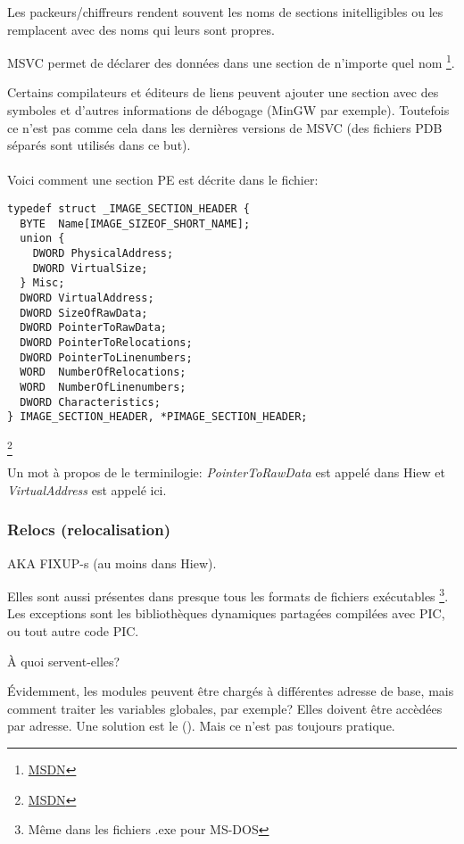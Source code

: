 Les packeurs/chiffreurs rendent souvent les noms de sections initelligibles ou les
remplacent avec des noms qui leurs sont propres.

\ac{MSVC} permet de déclarer des données dans une section de n'importe quel nom
\footnote{\href{http://go.yurichev.com/17047}{MSDN}}.

Certains compilateurs et éditeurs de liens peuvent ajouter une section avec des symboles
et d'autres informations de débogage (MinGW par exemple).
Toutefois ce n'est pas comme cela dans les dernières versions de \ac{MSVC} (des fichiers
\gls{PDB} séparés sont utilisés dans ce but).\\
\\
Voici comment une section PE est décrite dans le fichier:

\begin{lstlisting}
typedef struct _IMAGE_SECTION_HEADER {
  BYTE  Name[IMAGE_SIZEOF_SHORT_NAME];
  union {
    DWORD PhysicalAddress;
    DWORD VirtualSize;
  } Misc;
  DWORD VirtualAddress;
  DWORD SizeOfRawData;
  DWORD PointerToRawData;
  DWORD PointerToRelocations;
  DWORD PointerToLinenumbers;
  WORD  NumberOfRelocations;
  WORD  NumberOfLinenumbers;
  DWORD Characteristics;
} IMAGE_SECTION_HEADER, *PIMAGE_SECTION_HEADER;
\end{lstlisting}
\footnote{\href{http://go.yurichev.com/17048}{MSDN}}

Un mot à propos de le terminilogie: \emph{PointerToRawData} est appelé  dans
Hiew et \emph{VirtualAddress} est appelé  ici.

\subsubsection{Relocs (relocalisation)}
\label{subsec:relocs}

\ac{AKA} FIXUP-s (au moins dans Hiew).

Elles sont aussi présentes dans presque tous les formats de fichiers exécutables
\footnote{Même dans les fichiers .exe pour MS-DOS}.
Les exceptions sont les bibliothèques dynamiques partagées compilées avec \ac{PIC},
ou tout autre code \ac{PIC}.

À quoi servent-elles?

Évidemment, les modules peuvent être chargés à différentes adresse de base, mais
comment traiter les variables globales, par exemple? Elles doivent être accèdées
par adresse. Une solution est le \PICcode{} ().
Mais ce n'est pas toujours pratique.

